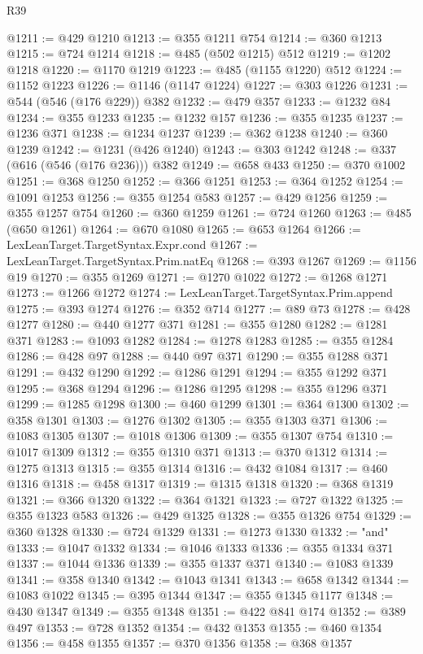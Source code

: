 \begin{lexlean}{R39}
\begin{coremodule}
@1211 := @429 @1210
@1213 := @355 @1211 @754
@1214 := @360 @1213
@1215 := @724 @1214
@1218 := @485 (@502 @1215) @512
@1219 := @1202 @1218
@1220 := @1170 @1219
@1223 := @485 (@1155 @1220) @512
@1224 := @1152 @1223
@1226 := @1146 (@1147 @1224)
@1227 := @303 @1226
@1231 := @544 (@546 (@176 @229)) @382
@1232 := @479 @357
@1233 := @1232 @84
@1234 := @355 @1233
@1235 := @1232 @157
@1236 := @355 @1235
@1237 := @1236 @371
@1238 := @1234 @1237
@1239 := @362 @1238
@1240 := @360 @1239
@1242 := @1231 (@426 @1240)
@1243 := @303 @1242
@1248 := @337 (@616 (@546 (@176 @236))) @382
@1249 := @658 @433
@1250 := @370 @1002
@1251 := @368 @1250
@1252 := @366 @1251
@1253 := @364 @1252
@1254 := @1091 @1253
@1256 := @355 @1254 @583
@1257 := @429 @1256
@1259 := @355 @1257 @754
@1260 := @360 @1259
@1261 := @724 @1260
@1263 := @485 (@650 @1261)
@1264 := @670 @1080
@1265 := @653 @1264
@1266 := LexLeanTarget.TargetSyntax.Expr.cond
@1267 := LexLeanTarget.TargetSyntax.Prim.natEq
@1268 := @393 @1267
@1269 := @1156 @19
@1270 := @355 @1269
@1271 := @1270 @1022
@1272 := @1268 @1271
@1273 := @1266 @1272
@1274 := LexLeanTarget.TargetSyntax.Prim.append
@1275 := @393 @1274
@1276 := @352 @714
@1277 := @89 @73
@1278 := @428 @1277
@1280 := @440 @1277 @371
@1281 := @355 @1280
@1282 := @1281 @371
@1283 := @1093 @1282
@1284 := @1278 @1283
@1285 := @355 @1284
@1286 := @428 @97
@1288 := @440 @97 @371
@1290 := @355 @1288 @371
@1291 := @432 @1290
@1292 := @1286 @1291
@1294 := @355 @1292 @371
@1295 := @368 @1294
@1296 := @1286 @1295
@1298 := @355 @1296 @371
@1299 := @1285 @1298
@1300 := @460 @1299
@1301 := @364 @1300
@1302 := @358 @1301
@1303 := @1276 @1302
@1305 := @355 @1303 @371
@1306 := @1083 @1305
@1307 := @1018 @1306
@1309 := @355 @1307 @754
@1310 := @1017 @1309
@1312 := @355 @1310 @371
@1313 := @370 @1312
@1314 := @1275 @1313
@1315 := @355 @1314
@1316 := @432 @1084
@1317 := @460 @1316
@1318 := @458 @1317
@1319 := @1315 @1318
@1320 := @368 @1319
@1321 := @366 @1320
@1322 := @364 @1321
@1323 := @727 @1322
@1325 := @355 @1323 @583
@1326 := @429 @1325
@1328 := @355 @1326 @754
@1329 := @360 @1328
@1330 := @724 @1329
@1331 := @1273 @1330
@1332 := "and"
@1333 := @1047 @1332
@1334 := @1046 @1333
@1336 := @355 @1334 @371
@1337 := @1044 @1336
@1339 := @355 @1337 @371
@1340 := @1083 @1339
@1341 := @358 @1340
@1342 := @1043 @1341
@1343 := @658 @1342
@1344 := @1083 @1022
@1345 := @395 @1344
@1347 := @355 @1345 @1177
@1348 := @430 @1347
@1349 := @355 @1348
@1351 := @422 @841 @174
@1352 := @389 @497
@1353 := @728 @1352
@1354 := @432 @1353
@1355 := @460 @1354
@1356 := @458 @1355
@1357 := @370 @1356
@1358 := @368 @1357

\end{coremodule}
\end{lexlean}
